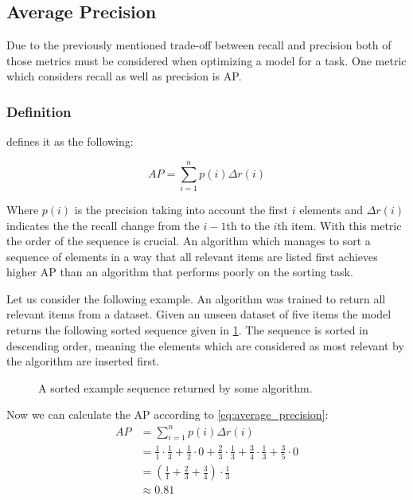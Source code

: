 \subsection{Average Precision}
\label{chp:fundamentals:sec:metrics:subsec:average_precision}

Due to the previously mentioned trade-off between recall and precision both of those metrics must be considered when optimizing a model for a task.
One metric which considers recall as well as precision is \ac{AP}.

\subsubsection{Definition}
\label{chp:fundamentals:sec:metrics:subsec:average_precision:definition}

\Textcite{Zhu:2004} defines it as the following:

\begin{equation}\label{eq:average_precision}
    AP = \sum_{i=1}^n {p(i)\Delta r(i)}
\end{equation}

Where $p(i)$ is the precision taking into account the first $i$ elements and $\Delta r(i)$ indicates the the recall change from the $i-1$th to the $i$th item.
With this metric the order of the sequence is crucial.
An algorithm which manages to sort a sequence of elements in a way that all relevant items are listed first achieves higher AP than an algorithm that performs poorly on the sorting task.

Let us consider the following example.
An algorithm was trained to return all relevant items from a dataset.
Given an unseen dataset of five items the model returns the following sorted sequence given in \cref{fig:metrics:average_precision:sample}.
The sequence is sorted in descending order, meaning the elements which are considered as most relevant by the algorithm are inserted first.

\begin{figure}[htpb]
    \centering
    \def\svgwidth{\columnwidth}
    
    \caption[Example Sequence]{A sorted example sequence returned by some algorithm.}\label{fig:metrics:average_precision:sample}
\end{figure}

Now we can calculate the \ac{AP} according to \cref{eq:average_precision}:
\begin{equation}
    \begin{aligned}
        AP &= \sum_{i=1}^n {p(i)\Delta r(i)}\\
        &= \frac{1}{1} \cdot \frac{1}{3} + \frac{1}{2} \cdot 0 + \frac{2}{3} \cdot \frac{1}{3} + \frac{3}{4} \cdot \frac{1}{3} + \frac{3}{5} \cdot 0\\
        &=  (\frac{1}{1} + \frac{2}{3}  + \frac{3}{4}) \cdot \frac{1}{3}\\
        &\approx 0.81
    \end{aligned}
\end{equation}

